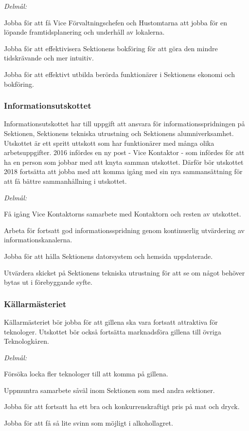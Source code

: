 \documentclass[../_main/handlingar.tex]{subfiles}
\begin{document}
\emph{Delmål:}
\begin{dashlist}
    \item Jobba för att få Vice Förvaltningschefen och Hustomtarna att jobba för en löpande framtidsplanering och underhåll av lokalerna.
    \item Jobba för att effektivisera Sektionens bokföring för att göra den mindre tidskrävande och mer intuitiv.
    \item Jobba för att effektivt utbilda berörda funktionärer i Sektionens ekonomi och bokföring.
\end{dashlist}

\newpage

\subsubsection*{Informationsutskottet}
Informationsutskottet har till uppgift att ansvara för informationsspridningen på Sektionen, Sektionens tekniska utrustning och Sektionens alumniverksamhet. Utskottet är ett spritt uttskott som har funktionärer med många olika arbetsuppgifter. 2016 infördes en ny post - Vice Kontaktor - som infördes för att ha en person som jobbar med att knyta samman utskottet. Därför bör utskottet 2018 fortsätta att jobba med att komma igång med sin nya sammansättning för att få bättre sammanhållning i utskottet.

\emph{Delmål:}
\begin{dashlist}
    \item Få igång Vice Kontaktorns samarbete med Kontaktorn och resten av utskottet.
    \item Arbeta för fortsatt god informationsspridning genom kontinuerlig utvärdering av informationskanalerna.
    \item Jobba för att hålla Sektionens datorsystem och hemsida uppdaterade.
    \item Utvärdera skicket på Sektionens tekniska utrustning för att se om något behöver bytas ut i förebyggande syfte.
\end{dashlist}

\subsubsection*{Källarmästeriet}
Källarmästeriet bör jobba för att gillena ska vara fortsatt attraktiva för teknologer. Utskottet bör också fortsätta marknadsföra gillena till övriga Teknologkåren.

\emph{Delmål:}
\begin{dashlist}
    \item Försöka locka fler teknologer till att komma på gillena.
    \item Uppmuntra samarbete såväl inom Sektionen som med andra sektioner.
    \item Jobba för att fortsatt ha ett bra och konkurrenskraftigt pris på mat och dryck.
    \item Jobba för att få så lite svinn som möjligt i alkohollagret.
\end{dashlist}
\end{document}
